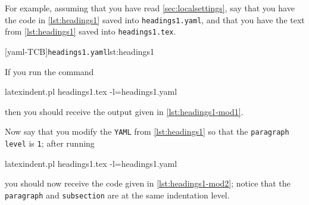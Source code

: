 For example, assuming that you have read \vref{sec:localsettings}, say that 
you have the code in \cref{lst:headings1} saved into \texttt{headings1.yaml},
and that you have the text from \cref{lst:headings1} saved into \texttt{headings1.tex}. 

\begin{minipage}{.45\textwidth}
[yaml-TCB]{\texttt{headings1.yaml}}{lst:headings1}
\end{minipage}%
\hfill
\begin{minipage}{.45\textwidth}
\end{minipage}

If you run the command
\begin{commandshell}
latexindent.pl headings1.tex -l=headings1.yaml
\end{commandshell}
then you should receive the output given in \cref{lst:headings1-mod1}.

\begin{minipage}{.45\textwidth}
\end{minipage}%
\hfill
\begin{minipage}{.45\textwidth}
\end{minipage}

Now say that you modify the \texttt{YAML} from \cref{lst:headings1} so that the \texttt{paragraph} \texttt{level} is \texttt{1}; after 
running
\begin{commandshell}
latexindent.pl headings1.tex -l=headings1.yaml
\end{commandshell}
you should now receive the code given in \cref{lst:headings1-mod2}; notice that
the \texttt{paragraph} and \texttt{subsection} are at the same indentation level.
